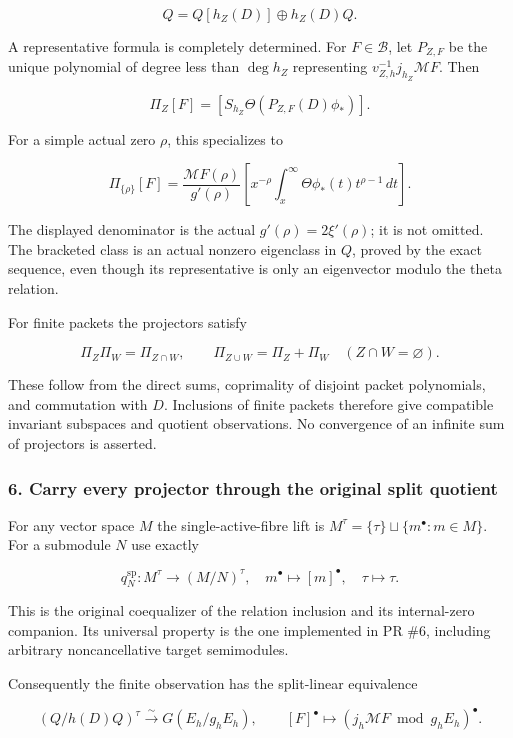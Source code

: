 \[\boxed{Q=Q[h_Z(D)]\oplus h_Z(D)Q.}\]

A representative formula is completely determined. For \(F\in\mathscr B\), let \(P_{Z,F}\) be the
unique polynomial of degree less than \(\deg h_Z\) representing \(v_{Z,h}^{-1}j_{h_Z}\mathcal MF\).
Then

\[\boxed{\Pi_Z[F]=[S_{h_Z}\Theta(P_{Z,F}(D)\phi_*)].}\]

For a simple actual zero \(\rho\), this specializes to

\[\Pi_{\{\rho\}}[F]=\frac{\mathcal MF(\rho)}{g'(\rho)}
\left[x^{-\rho}\int_x^\infty\Theta\phi_*(t)t^{\rho-1}\,dt\right].\]

The displayed denominator is the actual \(g'(\rho)=2\xi'(\rho)\); it is not omitted. The bracketed
class is an actual nonzero eigenclass in \(Q\), proved by the exact sequence, even though its
representative is only an eigenvector modulo the theta relation.

For finite packets the projectors satisfy

\[\Pi_Z\Pi_W=\Pi_{Z\cap W},\qquad
\Pi_{Z\cup W}=\Pi_Z+\Pi_W\quad(Z\cap W=\varnothing).\]

These follow from the direct sums, coprimality of disjoint packet polynomials, and commutation with
\(D\). Inclusions of finite packets therefore give compatible invariant subspaces and quotient
observations. No convergence of an infinite sum of projectors is asserted.

\subsubsection{6. Carry every projector through the original split
quotient}\label{pr_8:carry-every-projector-through-the-original-split-quotient}

For any vector space \(M\) the single-active-fibre lift is
\(M^\tau=\{\tau\}\sqcup\{m^\bullet:m\in M\}\). For a submodule \(N\) use exactly

\[q_N^{\mathrm{sp}}:M^\tau\to(M/N)^\tau,\quad
m^\bullet\mapsto[m]^\bullet,\quad\tau\mapsto\tau.\]

This is the original coequalizer of the relation inclusion and its internal-zero companion. Its
universal property is the one implemented in PR \#6, including arbitrary noncancellative target
semimodules.

Consequently the finite observation has the split-linear equivalence

\[\boxed{(Q/h(D)Q)^\tau\xrightarrow{\sim}G(E_h/g_hE_h),\qquad
[F]^\bullet\mapsto(j_h\mathcal MF\bmod g_hE_h)^\bullet.}\]


